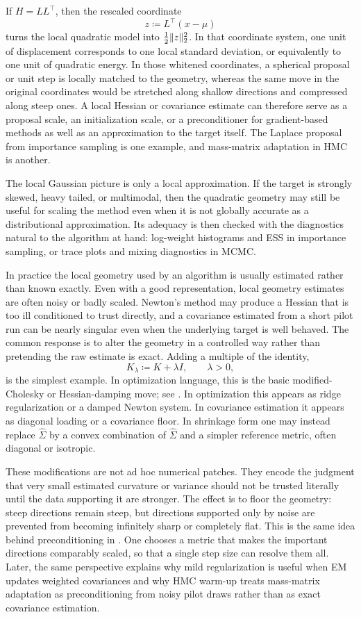 If $H=LL^\top$, then the rescaled coordinate
\[
  z \coloneqq L^\top(x-\mu)
\]
turns the local quadratic model into $\frac{1}{2}\lVert z\rVert_2^2$.
In that coordinate system, one unit of displacement corresponds to one local standard deviation, or equivalently to one unit of quadratic energy.
In those whitened coordinates, a spherical proposal or unit step is locally matched to the geometry, whereas the same move in the original coordinates would be stretched along shallow directions and compressed along steep ones.
A local Hessian or covariance estimate can therefore serve as a proposal scale, an initialization scale, or a preconditioner for gradient-based methods as well as an approximation to the target itself.
The Laplace proposal from importance sampling is one example, and mass-matrix adaptation in HMC is another.

The local Gaussian picture is only a local approximation.
If the target is strongly skewed, heavy tailed, or multimodal, then the quadratic geometry may still be useful for scaling the method even when it is not globally accurate as a distributional approximation.
Its adequacy is then checked with the diagnostics natural to the algorithm at hand: log-weight histograms and ESS in importance sampling, or trace plots and mixing diagnostics in MCMC.

\label{subsubsec:damping-preconditioning}
In practice the local geometry used by an algorithm is usually estimated rather than known exactly.
Even with a good representation, local geometry estimates are often noisy or badly scaled.
Newton's method may produce a Hessian that is too ill conditioned to trust directly, and a covariance estimated from a short pilot run can be nearly singular even when the underlying target is well behaved.
The common response is to alter the geometry in a controlled way rather than pretending the raw estimate is exact.
Adding a multiple of the identity,
\[
  K_\lambda \coloneqq K + \lambda I,
  \qquad \lambda>0,
\]
is the simplest example.
In optimization language, this is the basic modified-Cholesky or Hessian-damping move; see \citet[Alg.~3.3]{nocedal_wright_2006_numerical}.
In optimization this appears as ridge regularization or a damped Newton system.
In covariance estimation it appears as diagonal loading or a covariance floor.
In shrinkage form one may instead replace $\hat\Sigma$ by a convex combination of $\hat\Sigma$ and a simpler reference metric, often diagonal or isotropic.

These modifications are not ad hoc numerical patches.
They encode the judgment that very small estimated curvature or variance should not be trusted literally until the data supporting it are stronger.
The effect is to floor the geometry: steep directions remain steep, but directions supported only by noise are prevented from becoming infinitely sharp or completely flat.
This is the same idea behind preconditioning in .
One chooses a metric that makes the important directions comparably scaled, so that a single step size can resolve them all.
Later, the same perspective explains why mild regularization is useful when EM updates weighted covariances and why HMC warm-up treats mass-matrix adaptation as preconditioning from noisy pilot draws rather than as exact covariance estimation.
